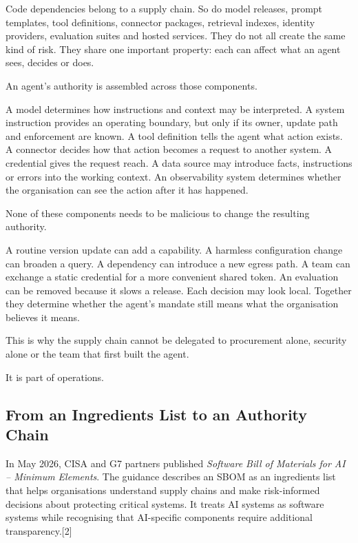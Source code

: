 Code dependencies belong to a supply chain. So do model releases, prompt
templates, tool definitions, connector packages, retrieval indexes,
identity providers, evaluation suites and hosted services. They do not
all create the same kind of risk. They share one important property:
each can affect what an agent sees, decides or does.

An agent's authority is assembled across those components.

A model determines how instructions and context may be interpreted. A
system instruction provides an operating boundary, but only if its
owner, update path and enforcement are known. A tool definition tells
the agent what action exists. A connector decides how that action
becomes a request to another system. A credential gives the request
reach. A data source may introduce facts, instructions or errors into
the working context. An observability system determines whether the
organisation can see the action after it has happened.

None of these components needs to be malicious to change the resulting
authority.

A routine version update can add a capability. A harmless configuration
change can broaden a query. A dependency can introduce a new egress
path. A team can exchange a static credential for a more convenient
shared token. An evaluation can be removed because it slows a release.
Each decision may look local. Together they determine whether the
agent's mandate still means what the organisation believes it means.

This is why the supply chain cannot be delegated to procurement alone,
security alone or the team that first built the agent.

It is part of operations.

\subsection{From an Ingredients List to an Authority
Chain}\label{from-an-ingredients-list-to-an-authority-chain}

In May 2026, CISA and G7 partners published \emph{Software Bill of
Materials for AI -- Minimum Elements}. The guidance describes an SBOM as
an ingredients list that helps organisations understand supply chains
and make risk-informed decisions about protecting critical systems. It
treats AI systems as software systems while recognising that AI-specific
components require additional transparency.{[}2{]}

